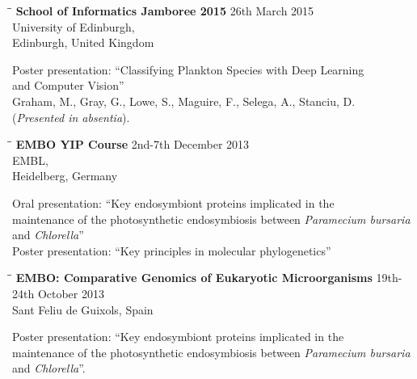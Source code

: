 \documentclass{res}
\begin{document}
\begin{resume}
\begin{tabbing}
\hspace{2in}\= \hspace{2.6in}\= \kill
{\bf School of Informatics Jamboree 2015} \> \> 26th March 2015\\
\> \>University of Edinburgh,  \\
\> \> Edinburgh, United Kingdom\\
\end{tabbing}\vspace{-40pt}
Poster presentation: ``Classifying Plankton Species with Deep Learning \\
and Computer Vision''\\
Graham, M., Gray, G., Lowe, S., Maguire, F., Selega, A., Stanciu, D. \\
(\emph{Presented in absentia}).


\begin{tabbing}
\hspace{2in}\= \hspace{2.6in}\= \kill
{\bf EMBO YIP Course} \> \> 2nd-7th December 2013\\
\> \> EMBL, \\
\> \> Heidelberg, Germany\\
\end{tabbing}\vspace{-40pt}
Oral presentation: ``Key endosymbiont proteins implicated in the \\ maintenance of the photosynthetic endosymbiosis between \textit{Paramecium bursaria} \\ and \textit{Chlorella}''\\
Poster presentation: ``Key principles in molecular phylogenetics''

\vspace{-0.1in}
     \begin{tabbing} 
   \hspace{2in}\= \hspace{2.6in}\= \kill 
    {\bf EMBO: Comparative Genomics of Eukaryotic Microorganisms}
    \>  \> 19th-24th October 2013\\
                         \>    \> Sant Feliu de Guixols, Spain
   \end{tabbing}\vspace{-20pt}      
      Poster presentation: ``Key endosymbiont proteins implicated in the \\ maintenance of the photosynthetic endosymbiosis between \textit{Paramecium bursaria} \\ and \textit{Chlorella}''.
      \vspace{-0.1in}


\end{resume}
\end{document}
